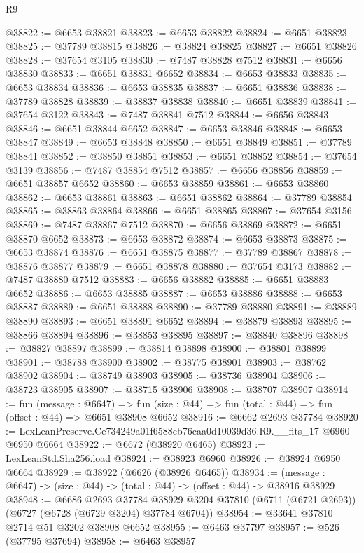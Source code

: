 \begin{lexlean}{R9}
\begin{coremodule}
@38822 := @6653 @38821
@38823 := @6653 @38822
@38824 := @6651 @38823
@38825 := @37789 @38815
@38826 := @38824 @38825
@38827 := @6651 @38826
@38828 := @37654 @3105
@38830 := @7487 @38828 @7512
@38831 := @6656 @38830
@38833 := @6651 @38831 @6652
@38834 := @6653 @38833
@38835 := @6653 @38834
@38836 := @6653 @38835
@38837 := @6651 @38836
@38838 := @37789 @38828
@38839 := @38837 @38838
@38840 := @6651 @38839
@38841 := @37654 @3122
@38843 := @7487 @38841 @7512
@38844 := @6656 @38843
@38846 := @6651 @38844 @6652
@38847 := @6653 @38846
@38848 := @6653 @38847
@38849 := @6653 @38848
@38850 := @6651 @38849
@38851 := @37789 @38841
@38852 := @38850 @38851
@38853 := @6651 @38852
@38854 := @37654 @3139
@38856 := @7487 @38854 @7512
@38857 := @6656 @38856
@38859 := @6651 @38857 @6652
@38860 := @6653 @38859
@38861 := @6653 @38860
@38862 := @6653 @38861
@38863 := @6651 @38862
@38864 := @37789 @38854
@38865 := @38863 @38864
@38866 := @6651 @38865
@38867 := @37654 @3156
@38869 := @7487 @38867 @7512
@38870 := @6656 @38869
@38872 := @6651 @38870 @6652
@38873 := @6653 @38872
@38874 := @6653 @38873
@38875 := @6653 @38874
@38876 := @6651 @38875
@38877 := @37789 @38867
@38878 := @38876 @38877
@38879 := @6651 @38878
@38880 := @37654 @3173
@38882 := @7487 @38880 @7512
@38883 := @6656 @38882
@38885 := @6651 @38883 @6652
@38886 := @6653 @38885
@38887 := @6653 @38886
@38888 := @6653 @38887
@38889 := @6651 @38888
@38890 := @37789 @38880
@38891 := @38889 @38890
@38893 := @6651 @38891 @6652
@38894 := @38879 @38893
@38895 := @38866 @38894
@38896 := @38853 @38895
@38897 := @38840 @38896
@38898 := @38827 @38897
@38899 := @38814 @38898
@38900 := @38801 @38899
@38901 := @38788 @38900
@38902 := @38775 @38901
@38903 := @38762 @38902
@38904 := @38749 @38903
@38905 := @38736 @38904
@38906 := @38723 @38905
@38907 := @38715 @38906
@38908 := @38707 @38907
@38914 := fun (message : @6647) =>
  fun (size : @44) => fun (total : @44) => fun (offset : @44) => @6651 @38908 @6652
@38916 := @6662 @2693 @37784
@38920 := LexLeanPreserve.Ce734249a01f6588cb76caa0d10039d36.R9.__fits_17 @6960 @6950 @6664
@38922 := @6672 (@38920 @6465)
@38923 := LexLeanStd.Sha256.load
@38924 := @38923 @6960
@38926 := @38924 @6950 @6664
@38929 := @38922 (@6626 (@38926 @6465))
@38934 := (message : @6647) -> (size : @44) -> (total : @44) -> (offset : @44) -> @38916 @38929
@38948 := @6686
    @2693
    @37784
    @38929
    @3204
    @37810
    (@6711 (@6721 @2693))
    (@6727 (@6728 (@6729 @3204) @37784 @6704))
@38954 := @33641 @37810 @2714 @51 @3202 @38908 @6652
@38955 := @6463 @37797
@38957 := @526 (@37795 @37694)
@38958 := @6463 @38957

\end{coremodule}
\end{lexlean}

